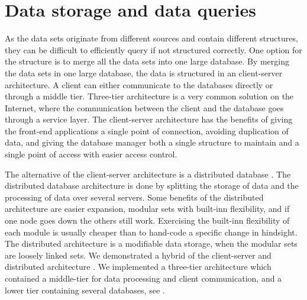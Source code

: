 


\section{Data storage and data queries} %
\label{sec:discussion_data_storage_and_data_queries}
As the data sets originate from different sources and contain different
structures, they can be difficult to efficiently query if not structured
correctly. One option for the structure is to merge all the
data sets into one large database. By merging the data sets in one large
database, the data is structured in an client-server architecture. 
A client can either communicate to the databases directly or through a middle
tier. Three-tier architecture is a very common solution on the Internet, where 
the communication between the client and the database goes through a service 
layer\cite[pp. 294-297]{toftHanseMallaugDatabaser}. The client-server 
architecture has the benefits of giving the front-end applications a single 
point of connection, avoiding duplication of data, and giving the database 
manager both a single structure to maintain and a single point of access with 
easier access control.

The alternative of the client-server architecture is a distributed
database \cite[pp. 301-303]{toftHanseMallaugDatabaser}. The distributed database
architecture is done by splitting the storage of data and the processing of
data over several servers. Some benefits of the distributed architecture are 
easier expansion, modular sets with built-inn flexibility, and if one node 
goes down the others still work. Exercising the built-inn flexibility of each
module is usually cheaper than to hand-code a specific change in hindsight\cite[pp. 117-130]{Bass:2012:SAP:2392670}. The distributed architecture is a 
modifiable data storage, when the modular sets are loosely linked sets. 
We demonstrated a hybrid of the client-server and distributed
architecture \cite[pp. 297-299]{toftHanseMallaugDatabaser}. We implemented a 
three-tier architecture which contained a middle-tier for data processing and 
client communication, and a lower tier containing several databases, see .

